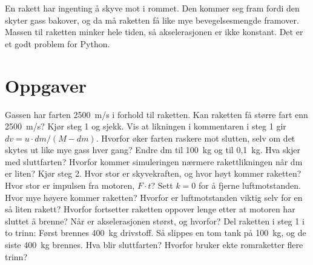 \documentclass[11pt]{article}
\begin{document}

En rakett har ingenting å skyve mot i rommet. Den kommer seg fram fordi den skyter gass bakover, og da må raketten få like mye bevegelsesmengde framover. Massen til raketten minker hele tiden, så akselerasjonen er ikke konstant. Det er et godt problem for Python.

\section*{Oppgaver}

\begin{oppgaveliste}
\oppgave {}Gassen har farten 2500~m/s i forhold til raketten. Kan raketten få større fart enn 2500~m/s? Kjør steg 1 og sjekk.
\svar
\oppgave {}Vis at likningen i kommentaren i steg 1 gir $dv = u \cdot dm / (M - dm)$. Hvorfor øker farten raskere mot slutten, selv om det skytes ut like mye gass hver gang?
\svar
\oppgave {}Endre dm til 100~kg og til 0,1~kg. Hva skjer med sluttfarten? Hvorfor kommer simuleringen nærmere rakettlikningen når dm er liten?
\svar
\oppgave {}Kjør steg 2. Hvor stor er skyvekraften, og hvor høyt kommer raketten? Hvor stor er impulsen fra motoren, $F \cdot t$?
\svar
\oppgave {}Sett $k = 0$ for å fjerne luftmotstanden. Hvor mye høyere kommer raketten? Hvorfor er luftmotstanden viktig selv for en så liten rakett?
\svar
\oppgave {}Hvorfor fortsetter raketten oppover lenge etter at motoren har sluttet å brenne? Når er akselerasjonen størst, og hvorfor?
\svar
\oppgave {}Del raketten i steg 1 i to trinn: Først brennes 400~kg drivstoff. Så slippes en tom tank på 100~kg, og de siste 400~kg brennes. Hva blir sluttfarten? Hvorfor bruker ekte romraketter flere trinn?
\svar
\end{oppgaveliste}
\end{document}
